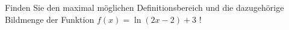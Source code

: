 \item 
Finden Sie den maximal möglichen Definitionsbereich und die dazugehörige Bildmenge der Funktion $f(x)=\ln(2x-2)+3$ !

